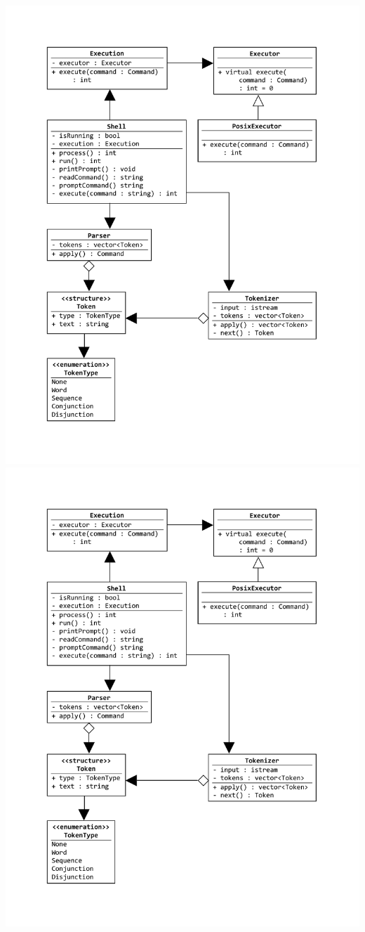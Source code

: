\documentclass{article}
\begin{document}
  \includegraphics[page=2,scale=0.6]{Diagram.pdf}
  \includegraphics[page=1,scale=0.6]{Diagram.pdf}
\end{document}
